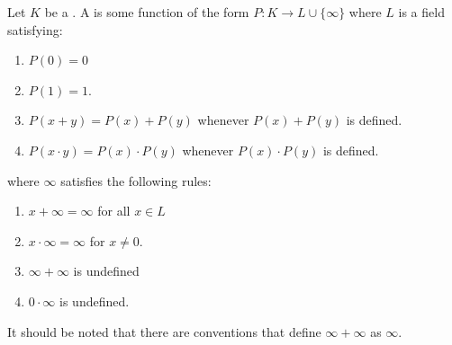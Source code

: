 \begin{definition} \label{definition:place_of_a_field}
    Let $K$ be a .
    A  is some function of the form $P: K \to L \cup \{\infty\}$ where $L$ is a field satisfying:
    \begin{enumerate}
        \item $P(0) = 0$
        \item $P(1) = 1$.
        \item $P(x+y) = P(x) + P(y)$ whenever $P(x) + P(y)$ is defined.
        \item $P(x \cdot y) = P(x) \cdot P(y)$ whenever $P(x) \cdot P(y)$ is defined.
    \end{enumerate}
    where $\infty$ satisfies the following rules:
    \begin{enumerate}
        \item $x+\infty = \infty$ for all $x \in L$
        \item $x \cdot \infty = \infty$ for $x \neq 0$.
        \item $\infty + \infty$ is undefined
        \item $0 \cdot \infty$ is undefined.  
    \end{enumerate}
    It should be noted that there are conventions that define $\infty + \infty$ as $\infty$. 

\end{definition}
